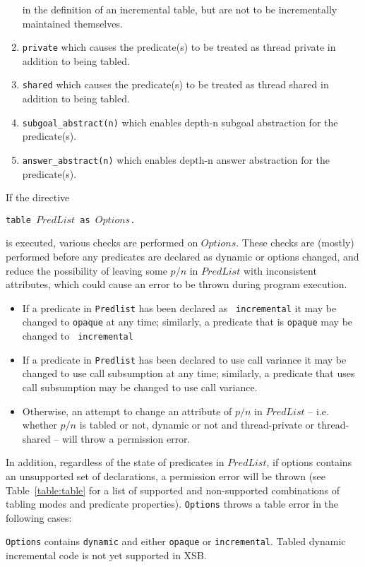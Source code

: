\begin{description}
\begin{enumerate}
  in the definition of an incremental table, but are not to be
  incrementally maintained themselves.  
%
\item {\tt private} which causes the predicate(s) to be treated as
  thread private in addition to being tabled.
%
\item {\tt shared} which causes the predicate(s) to be treated as
  thread shared in addition to being tabled.
%
\item {\tt subgoal\_abstract(n)}  which enables depth-n subgoal abstraction for the predicate(s).
%
\item {\tt answer\_abstract(n)} which enables depth-n answer
  abstraction for the predicate(s).
%
\ei
\ei
\end{enumerate}

If the directive 

{\tt  table $PredList$ as $Options$.}

is executed, various checks are performed on $Options$.  These checks
are (mostly) performed before any predicates are declared as dynamic
or options changed, and reduce the possibility of leaving some $p/n$
in $PredList$ with inconsistent attributes, which could cause an error
to be thrown during program execution.
%
\begin{itemize}
\item If a predicate in {\tt Predlist} has been declared as {\tt
  incremental} it may be changed to {\tt opaque} at any time;
  similarly, a predicate that is {\tt opaque} may be changed to {\tt
    incremental}
%
\item If a predicate in {\tt Predlist} has been declared to use call
  variance it may be changed to use call subsumption at any time;
  similarly, a predicate that uses call subsumption may be changed to
  use call variance.
%
\item Otherwise, an attempt to change an attribute of $p/n$ in
  $PredList$ -- i.e. whether $p/n$ is tabled or not, dynamic or not
  and thread-private or thread-shared -- will throw a permission
  error.  
\end{itemize}

In addition, regardless of the state of predicates in $PredList$, if
options contains an unsupported set of declarations, a permission error
will be thrown (see Table~\ref{table:table} for a list of supported
and non-supported combinations of tabling modes and predicate
properties).  {\tt Options} throws a table error in the following
cases:
%
\bi
\item {\tt Options} contains {\tt dynamic} and either {\tt opaque} or
  {\tt incremental}.  Tabled dynamic incremental code is not yet
  supported in XSB.


\end{description}
